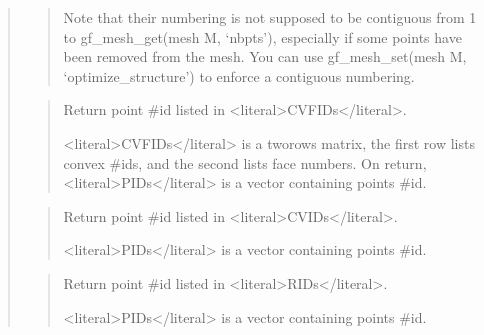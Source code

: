 \documentclass[a4paper,11pt,english]{sphinxmanual}
\begin{document}
\begin{quote}
\begin{quote}
\sphinxAtStartPar
Note that their numbering is not supposed to be contiguous from
1 to gf\_mesh\_get(mesh M, ‘nbpts’),
especially if some points have been removed from the mesh. You
can use gf\_mesh\_set(mesh M, ‘optimize\_structure’) to enforce a contiguous
numbering.
\end{quote}

\sphinxAtStartPar
{}
\begin{quote}

\sphinxAtStartPar
Return point \#id listed in \textless{}literal\textgreater{}CVFIDs\textless{}/literal\textgreater{}.

\sphinxAtStartPar
\textless{}literal\textgreater{}CVFIDs\textless{}/literal\textgreater{} is a two\sphinxhyphen{}rows matrix, the first row lists convex \#ids,
and the second lists face numbers. On return, \textless{}literal\textgreater{}PIDs\textless{}/literal\textgreater{} is a
vector containing points \#id.
\end{quote}

\sphinxAtStartPar
{}
\begin{quote}

\sphinxAtStartPar
Return point \#id listed in \textless{}literal\textgreater{}CVIDs\textless{}/literal\textgreater{}.

\sphinxAtStartPar
\textless{}literal\textgreater{}PIDs\textless{}/literal\textgreater{} is a vector containing points \#id.
\end{quote}

\sphinxAtStartPar
{}
\begin{quote}

\sphinxAtStartPar
Return point \#id listed in \textless{}literal\textgreater{}RIDs\textless{}/literal\textgreater{}.

\sphinxAtStartPar
\textless{}literal\textgreater{}PIDs\textless{}/literal\textgreater{} is a vector containing points \#id.
\end{quote}

\sphinxAtStartPar
{}
\begin{quote}


\end{quote}
\end{quote}
\end{document}
